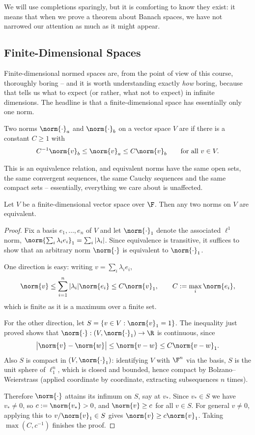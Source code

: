 We will use completions sparingly, but it is comforting to know they exist: it means that when we prove a theorem about Banach spaces, we have not narrowed our attention as much as it might appear.

\subsection{Finite-Dimensional Spaces}

Finite-dimensional normed spaces are, from the point of view of this course, thoroughly boring -- and it is worth understanding exactly \emph{how} boring, because that tells us what to expect (or rather, what not to expect) in infinite dimensions. The headline is that a finite-dimensional space has essentially only one norm.

\begin{definition}
	Two norms $\norm{\cdot}_a$ and $\norm{\cdot}_b$ on a vector space $V$ are  if there is a constant $C \geq 1$ with
	$$C^{-1} \norm{v}_b \leq \norm{v}_a \leq C \norm{v}_b \qquad \text{for all } v \in V.$$
\end{definition}

This is an equivalence relation, and equivalent norms have the same open sets, the same convergent sequences, the same Cauchy sequences and the same compact sets -- essentially, everything we care about is unaffected.

\begin{theorem}
	Let $V$ be a finite-dimensional vector space over $\F$. Then any two norms on $V$ are equivalent.
\end{theorem}

\begin{proof}
	Fix a basis $e_1, \dots, e_n$ of $V$ and let $\norm{\cdot}_1$ denote the associated $\ell^1$ norm, $\norm{\sum_i \lambda_i e_i}_1 = \sum_i |\lambda_i|$. Since equivalence is transitive, it suffices to show that an arbitrary norm $\norm{\cdot}$ is equivalent to $\norm{\cdot}_1$.

	One direction is easy: writing $v = \sum_i \lambda_i e_i$,
	$$\norm{v} \leq \sum_{i=1}^n |\lambda_i| \norm{e_i} \leq C \norm{v}_1, \qquad C := \max_i \norm{e_i},$$
	which is finite as it is a maximum over a finite set.

	For the other direction, let $S = \{v \in V : \norm{v}_1 = 1\}$. The inequality just proved shows that $\norm{\cdot} : (V, \norm{\cdot}_1) \to \R$ is continuous, since
	$$\big| \norm{v} - \norm{w} \big| \leq \norm{v - w} \leq C\norm{v-w}_1.$$
	Also $S$ is compact in $(V, \norm{\cdot}_1)$: identifying $V$ with $\F^n$ via the basis, $S$ is the unit sphere of $\ell_1^n$, which is closed and bounded, hence compact by Bolzano--Weierstrass (applied coordinate by coordinate, extracting subsequences $n$ times).

	Therefore $\norm{\cdot}$ attains its infimum on $S$, say at $v_*$. Since $v_* \in S$ we have $v_* \neq 0$, so $c := \norm{v_*} > 0$, and $\norm{v} \geq c$ for all $v \in S$. For general $v \neq 0$, applying this to $v / \norm{v}_1 \in S$ gives $\norm{v} \geq c \norm{v}_1$. Taking $\max(C, c^{-1})$ finishes the proof.
\end{proof}

